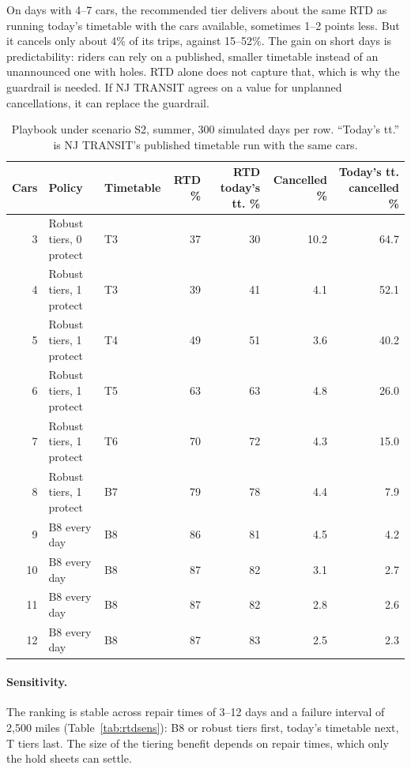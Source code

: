 \documentclass[11pt]{article}
\begin{document}
On days with 4--7 cars, the recommended tier delivers about the same RTD as running today's timetable with the cars available, sometimes 1--2 points less. But it cancels only about 4\% of its trips, against 15--52\%. The gain on short days is predictability: riders can rely on a published, smaller timetable instead of an unannounced one with holes. RTD alone does not capture that, which is why the guardrail is needed. If NJ TRANSIT agrees on a value for unplanned cancellations, it can replace the guardrail.
\begin{table}[ht]\centering\small
\begin{tabular}{@{}rllrrrr@{}}
\toprule
Cars & Policy & Timetable & RTD \% & RTD today's tt. \% & Cancelled \% & Today's tt. cancelled \% \\
\midrule
3 & Robust tiers, 0 protect & T3 & 37 & 30 & 10.2 & 64.7 \\
4 & Robust tiers, 1 protect & T3 & 39 & 41 & 4.1 & 52.1 \\
5 & Robust tiers, 1 protect & T4 & 49 & 51 & 3.6 & 40.2 \\
6 & Robust tiers, 1 protect & T5 & 63 & 63 & 4.8 & 26.0 \\
7 & Robust tiers, 1 protect & T6 & 70 & 72 & 4.3 & 15.0 \\
8 & Robust tiers, 1 protect & B7 & 79 & 78 & 4.4 & 7.9 \\
9 & B8 every day & B8 & 86 & 81 & 4.5 & 4.2 \\
10 & B8 every day & B8 & 87 & 82 & 3.1 & 2.7 \\
11 & B8 every day & B8 & 87 & 82 & 2.8 & 2.6 \\
12 & B8 every day & B8 & 87 & 83 & 2.5 & 2.3 \\
\bottomrule
\end{tabular}
\caption{Playbook under scenario S2, summer, 300 simulated days per row. ``Today's tt.'' is NJ TRANSIT's published timetable run with the same cars.}\label{tab:pb4}
\end{table}

\paragraph{Sensitivity.} The ranking is stable across repair times of 3--12 days and a failure interval of 2{,}500 miles (Table~\ref{tab:rtdsens}): B8 or robust tiers first, today's timetable next, T tiers last. The size of the tiering benefit depends on repair times, which only the hold sheets can settle.

\clearpage
\end{document}
